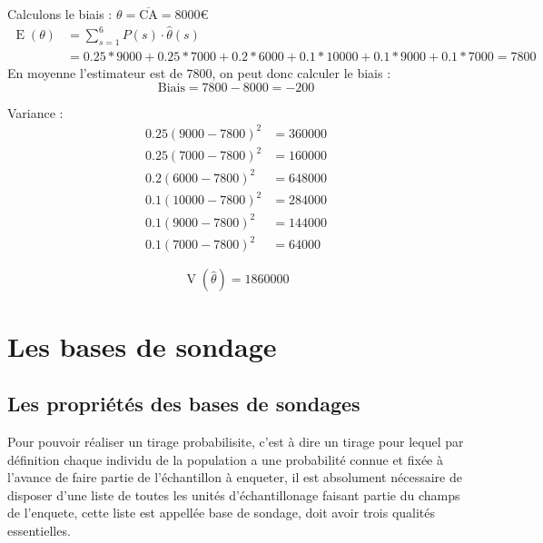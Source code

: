 \documentclass[a4paper]{article}
\DeclareMathOperator{\E}{E}
\DeclareMathOperator{\V}{V}
\begin{document}
\begin{Exemple}
Calculons le biais : $\theta = \overline{\text{CA}} = 8000€$
\begin{equation*}
\begin{split}
    \E\left( \theta \right) &= \sum_{s = 1}^{6} P(s) \cdot \hat{\theta}(s) \\
    &= 0.25 * 9000 + 0.25 * 7000 + 0.2 * 6000 + 0.1 * 10000 + 0.1 * 9000 + 0.1 * 7000 = 7800
\end{split}
\end{equation*}
En moyenne l'estimateur est de $7800$, on peut donc calculer le biais : 
\begin{equation*}
   \text{Biais} = 7800 - 8000 = -200 
\end{equation*}

Variance :
\begin{equation*}
\begin{split}
    0.25 (9000 - 7800)^2 &= 360000 \\
    0.25 (7000 - 7800)^2 &= 160000 \\
    0.2 (6000 - 7800)^2 &= 648000 \\
    0.1 (10000 - 7800)^2 &= 284000 \\
    0.1 (9000 - 7800)^2 &= 144000\\
    0.1 (7000 - 7800)^2 &= 64000
\end{split}
\end{equation*}

\begin{equation*}
    \V\left( \hat{\theta} \right) = 1860000 
\end{equation*}
\end{Exemple}


\section{Les bases de sondage}
\subsection{Les propriétés des bases de sondages}
Pour pouvoir réaliser un tirage probabilisite, c'est à dire un tirage pour lequel par définition chaque individu de la population a une probabilité
connue et fixée à l'avance de faire partie de l'échantillon à enqueter, il est absolument nécessaire de disposer d'une liste de toutes les unités
d'échantillonage faisant partie du champs de l'enquete, cette liste est appellée base de sondage, doit avoir trois qualités essentielles.
\end{document}
